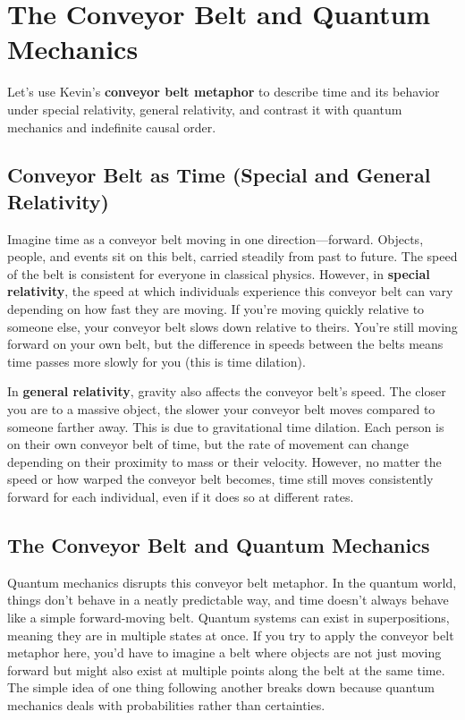 \section{The Conveyor Belt and Quantum Mechanics}

Let's use Kevin’s \textbf{conveyor belt metaphor} to describe time and its behavior under special relativity, general relativity, and contrast it with quantum mechanics and indefinite causal order.

\subsection{Conveyor Belt as Time (Special and General Relativity)}

Imagine time as a conveyor belt moving in one direction—forward. Objects, people, and events sit on this belt, carried steadily from past to future. The speed of the belt is consistent for everyone in classical physics. However, in \textbf{special relativity}, the speed at which individuals experience this conveyor belt can vary depending on how fast they are moving. If you're moving quickly relative to someone else, your conveyor belt slows down relative to theirs. You’re still moving forward on your own belt, but the difference in speeds between the belts means time passes more slowly for you (this is time dilation).

In \textbf{general relativity}, gravity also affects the conveyor belt’s speed. The closer you are to a massive object, the slower your conveyor belt moves compared to someone farther away. This is due to gravitational time dilation. Each person is on their own conveyor belt of time, but the rate of movement can change depending on their proximity to mass or their velocity. However, no matter the speed or how warped the conveyor belt becomes, time still moves consistently forward for each individual, even if it does so at different rates.

\subsection{The Conveyor Belt and Quantum Mechanics}

Quantum mechanics disrupts this conveyor belt metaphor. In the quantum world, things don't behave in a neatly predictable way, and time doesn’t always behave like a simple forward-moving belt. Quantum systems can exist in superpositions, meaning they are in multiple states at once. If you try to apply the conveyor belt metaphor here, you'd have to imagine a belt where objects are not just moving forward but might also exist at multiple points along the belt at the same time. The simple idea of one thing following another breaks down because quantum mechanics deals with probabilities rather than certainties.


